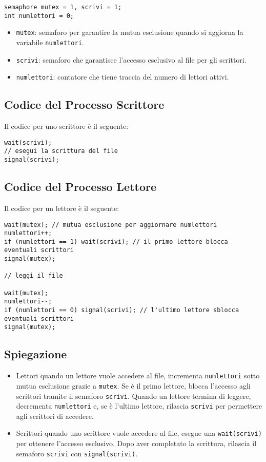 \begin{verbatim}
semaphore mutex = 1, scrivi = 1;
int numlettori = 0;
\end{verbatim}

\begin{itemize}
    \item \texttt{mutex}: semaforo per garantire la mutua esclusione quando si aggiorna la variabile \texttt{numlettori}.
    \item \texttt{scrivi}: semaforo che garantisce l'accesso esclusivo al file per gli scrittori.
    \item \texttt{numlettori}: contatore che tiene traccia del numero di lettori attivi.
\end{itemize}

\subsection{Codice del Processo Scrittore}
Il codice per uno scrittore è il seguente:

\begin{verbatim}
wait(scrivi);
// esegui la scrittura del file
signal(scrivi);
\end{verbatim}

\subsection{Codice del Processo Lettore}
Il codice per un lettore è il seguente:

\begin{verbatim}
wait(mutex); // mutua esclusione per aggiornare numlettori
numlettori++;
if (numlettori == 1) wait(scrivi); // il primo lettore blocca eventuali scrittori
signal(mutex);

// leggi il file

wait(mutex);
numlettori--;
if (numlettori == 0) signal(scrivi); // l'ultimo lettore sblocca eventuali scrittori
signal(mutex);
\end{verbatim}

\subsection{Spiegazione}
\begin{itemize}
    \item Lettori quando un lettore vuole accedere al file, incrementa \texttt{numlettori} sotto mutua esclusione grazie a \texttt{mutex}. Se è il primo lettore, blocca l'accesso agli scrittori tramite il semaforo \texttt{scrivi}. Quando un lettore termina di leggere, decrementa \texttt{numlettori} e, se è l'ultimo lettore, rilascia \texttt{scrivi} per permettere agli scrittori di accedere.
    \item Scrittori quando uno scrittore vuole accedere al file, esegue una \texttt{wait(scrivi)} per ottenere l'accesso esclusivo. Dopo aver completato la scrittura, rilascia il semaforo \texttt{scrivi} con \texttt{signal(scrivi)}.
\end{itemize}

